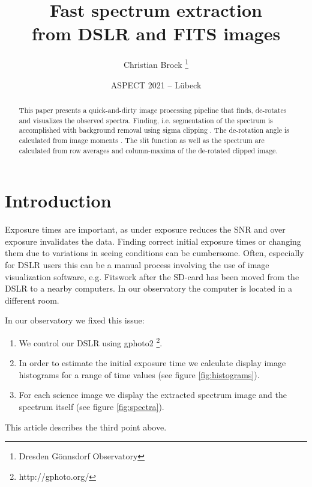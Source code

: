 \documentclass[10pt,a4paper,notitlepage]{article}
\title{Fast spectrum extraction \\
	{\small from DSLR and FITS images}}
\author{Christian Brock \footnote{Dresden Gönnsdorf Observatory}}
\date{ASPECT 2021 -- Lübeck}
\begin{document}
\setlength{\parindent}{0pt} 
\setlength{\parskip}{4pt} 

\maketitle

\tableofcontents

\begin{abstract}
	This paper presents a quick-and-dirty image processing pipeline that finds, de-rotates and visualizes the observed spectra.
	Finding, i.e. segmentation of the spectrum is accomplished with background removal using sigma clipping \cite{SigmaClipping}. The de-rotation angle is calculated from image moments \cite{ImageMoments}.
	The slit function as well as the spectrum are calculated from row averages and column-maxima of the de-rotated clipped image.
\end{abstract}

\section{Introduction}
	Exposure times are important, as under exposure reduces the SNR and over exposure invalidates the data.
	Finding correct initial exposure times or changing them due to variations in seeing conditions can be cumbersome.
	Often, especially for DSLR users this can be a manual process involving the use of image visualization software, e.g. Fitswork after the SD-card has been moved from the DSLR to a nearby computers. In our observatory the computer is located in a different room.
	
	In our observatory we fixed this issue:
	\begin{enumerate}
		\item We control our DSLR using gphoto2 \footnote{http://gphoto.org/}.
		\item In order to estimate the initial exposure time we calculate display image histograms for a range of time values (see figure \ref{fig:histograms}).
		\item For each science image we display the extracted spectrum image and the spectrum itself (see figure \ref{fig:spectra}).
	\end{enumerate}
	This article describes the third point above.
\end{document}
